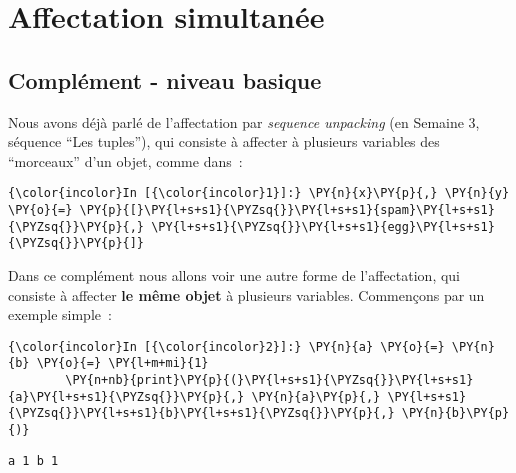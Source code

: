     
    
    
    

    

    \hypertarget{affectation-simultanuxe9e}{%
\section{Affectation simultanée}\label{affectation-simultanuxe9e}}

    \hypertarget{compluxe9ment---niveau-basique}{%
\subsection{Complément - niveau
basique}\label{compluxe9ment---niveau-basique}}

    Nous avons déjà parlé de l'affectation par \emph{sequence unpacking} (en
Semaine 3, séquence ``Les tuples''), qui consiste à affecter à plusieurs
variables des ``morceaux'' d'un objet, comme dans~:

    \begin{Verbatim}[commandchars=\\\{\},frame=single,framerule=0.3mm,rulecolor=\color{cellframecolor}]
{\color{incolor}In [{\color{incolor}1}]:} \PY{n}{x}\PY{p}{,} \PY{n}{y} \PY{o}{=} \PY{p}{[}\PY{l+s+s1}{\PYZsq{}}\PY{l+s+s1}{spam}\PY{l+s+s1}{\PYZsq{}}\PY{p}{,} \PY{l+s+s1}{\PYZsq{}}\PY{l+s+s1}{egg}\PY{l+s+s1}{\PYZsq{}}\PY{p}{]}
\end{Verbatim}


    Dans ce complément nous allons voir une autre forme de l'affectation,
qui consiste à affecter \textbf{le même objet} à plusieurs variables.
Commençons par un exemple simple~:

    \begin{Verbatim}[commandchars=\\\{\},frame=single,framerule=0.3mm,rulecolor=\color{cellframecolor}]
{\color{incolor}In [{\color{incolor}2}]:} \PY{n}{a} \PY{o}{=} \PY{n}{b} \PY{o}{=} \PY{l+m+mi}{1}
        \PY{n+nb}{print}\PY{p}{(}\PY{l+s+s1}{\PYZsq{}}\PY{l+s+s1}{a}\PY{l+s+s1}{\PYZsq{}}\PY{p}{,} \PY{n}{a}\PY{p}{,} \PY{l+s+s1}{\PYZsq{}}\PY{l+s+s1}{b}\PY{l+s+s1}{\PYZsq{}}\PY{p}{,} \PY{n}{b}\PY{p}{)}
\end{Verbatim}


    \begin{Verbatim}[commandchars=\\\{\},frame=single,framerule=0.3mm,rulecolor=\color{cellframecolor}]
a 1 b 1
\end{Verbatim}


